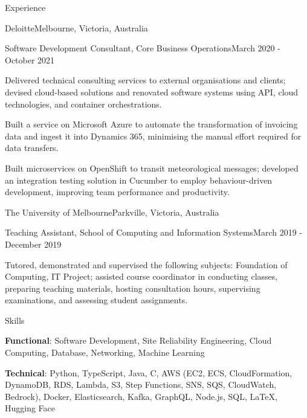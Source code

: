 \documentclass{cv}
\begin{document}
\begin{cvsection}{Experience}
\begin{cvheading}{Deloitte}{Melbourne, Victoria, Australia}
\begin{cvsubheading}{Software Development Consultant, Core Business Operations}{March 2020 - October 2021}
\item Delivered technical consulting services to external organisations and clients; devised cloud-based solutions and renovated software systems using API, cloud technologies, and container orchestrations.
\item Built a service on Microsoft Azure to automate the transformation of invoicing data and ingest it into Dynamics 365, minimising the manual effort required for data transfers.
\item Built microservices on OpenShift to transit meteorological messages; developed an integration testing solution in Cucumber to employ behaviour-driven development, improving team performance and productivity.
\end{cvsubheading}
\end{cvheading}

\begin{cvheading}{The University of Melbourne}{Parkville, Victoria, Australia}
\begin{cvsubheading}{Teaching Assistant, School of Computing and Information Systems}{March 2019 - December 2019}
\item Tutored, demonstrated and supervised the following subjects: Foundation of Computing, IT Project; assisted course coordinator in conducting classes, preparing teaching materials, hosting consultation hours, supervising examinations, and assessing student assignments.
\end{cvsubheading}
\end{cvheading}

\end{cvsection}

\begin{cvsection}{Skills}
\item \textbf{Functional}: Software Development, Site Reliability Engineering, Cloud Computing, Database, Networking, Machine Learning
\item \textbf{Technical}: Python, TypeScript, Java, C, AWS (EC2, ECS, CloudFormation, DynamoDB, RDS, Lambda, S3, Step Functions, SNS, SQS, CloudWatch, Bedrock), Docker, Elasticsearch, Kafka, GraphQL, Node.js, SQL, \LaTeX, Hugging Face
\end{cvsection}
\end{document}
